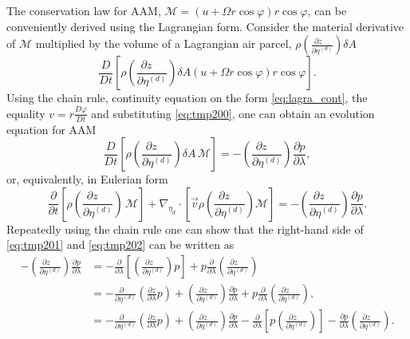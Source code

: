 \documentclass{agujournal}
\begin{document}
{The conservation law for AAM, $\mathcal{M}=\left( u+\Omega r \cos \varphi \right) r \cos \varphi$, can be conveniently derived using the Lagrangian form. Consider the material derivative of $\mathcal{M}$ multiplied by the volume of a Lagrangian air parcel, $\rho \left( \frac{\partial z\quad }{\partial \eta^{(d)}}\right)\delta A$
\begin{equation}
\frac{D}{Dt}\left[ \rho \left( \frac{\partial z\quad }{\partial \eta^{(d)}}\right) \delta A \left( u+\Omega r \cos \varphi \right) r \cos \varphi\right].
\end{equation}
Using the chain rule, continuity equation on the form \eqref{eq:lagra_cont}, the equality $v=r\frac{D\varphi}{Dt}$ and substituting \eqref{eq:tmp200}, one can obtain an evolution equation for AAM
\begin{equation}
\frac{D}{Dt}\left[ \rho \left( \frac{\partial z\quad }{\partial \eta^{(d)}}\right) \delta A\, \mathcal{M} \right]=- \left( \frac{\partial z\quad }{\partial \eta^{(d)}}\right) \frac{\partial p}{\partial \lambda},\label{eq:tmp201}
\end{equation}
or, equivalently, in Eulerian form
\begin{equation}
\frac{\partial}{\partial t}\left[ \rho \left( \frac{\partial z\quad }{\partial \eta^{(d)}}\right) \, \mathcal{M} \right]+\nabla_{\eta_d}\cdot \left[\vec{v} \rho \left( \frac{\partial z\quad }{\partial \eta^{(d)}}\right)  \mathcal{M} \right]=- \left( \frac{\partial z\quad }{\partial \eta^{(d)}}\right) \frac{\partial p}{\partial \lambda}.\label{eq:tmp202}
\end{equation}
Repeatedly using the chain rule one can show that the right-hand side of \eqref{eq:tmp201} and \eqref{eq:tmp202} can be written as
\begin{align}
- \left( \frac{\partial z\quad }{\partial \eta^{(d)}}\right)\frac{\partial p}{\partial \lambda}&=-\frac{\partial }{\partial \lambda}\left[  \left( \frac{\partial z\quad }{\partial \eta^{(d)}}\right) p\right]+p\frac{\partial }{\partial \lambda} \left( \frac{\partial z\quad }{\partial \eta^{(d)}}\right)\\ 
&=-\frac{\partial \quad}{\partial \eta^{(d)}}\left( \frac{\partial z}{\partial \lambda}p\right)+\left( \frac{\partial z\quad }{\partial \eta^{(d)}}\right)\frac{\partial p}{\partial \lambda}+p\frac{\partial }{\partial \lambda}\left( \frac{\partial z\quad }{\partial \eta^{(d)}}\right),\\
&=-\frac{\partial \quad}{\partial \eta^{(d)}}\left( \frac{\partial z}{\partial \lambda}p\right)+\left( \frac{\partial z\quad }{\partial \eta^{(d)}}\right)\frac{\partial p}{\partial \lambda}-\frac{\partial }{\partial \lambda}\left[ p\left( \frac{\partial z\quad }{\partial \eta^{(d)}}\right)\right]-\frac{\partial p}{\partial \lambda}\left( \frac{\partial z\quad }{\partial \eta^{(d)}}\right).\\

\end{align}}
\end{document}
